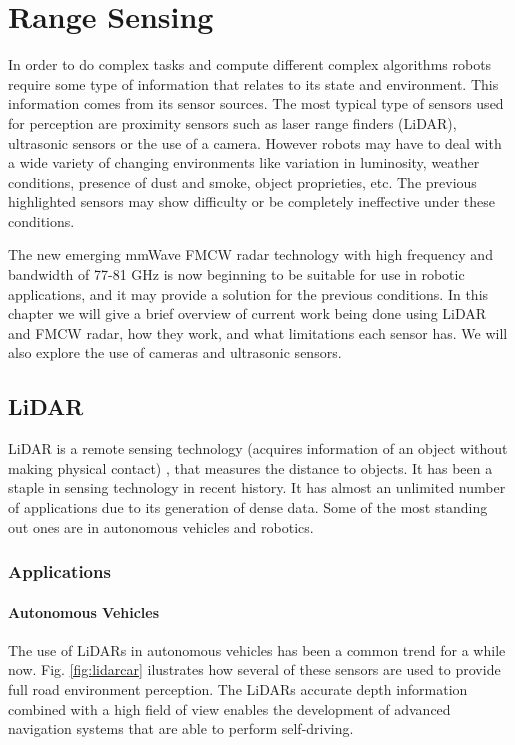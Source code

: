 \chapter{Range Sensing} \label{ch:Concepts}

In order to do complex tasks and compute different complex algorithms robots require some type of information that relates to its state and environment. This information comes from its sensor sources.
The most typical type of sensors used for perception are proximity sensors such as laser range finders (\ac{LiDAR}), ultrasonic sensors or the use of a camera. However robots may have to deal with a wide variety of changing environments like variation in luminosity, weather conditions, presence of dust and smoke, object proprieties, etc. The previous highlighted sensors may show difficulty or be completely ineffective under these conditions.

The new emerging \ac{mmWave} \ac{FMCW} radar technology with high frequency and bandwidth of 77-81 GHz is now beginning to be suitable for use in robotic applications, and it may provide a solution for the previous conditions. In this chapter we will give a brief overview of current work being done using \ac{LiDAR} and \ac{FMCW} \ac{radar}, how they work, and what limitations each sensor has. We will also explore the use of cameras and ultrasonic sensors.

\section{LiDAR}
\ac{LiDAR} is a remote sensing technology (acquires information of an object without making physical contact) , that measures the distance to objects. It has been a staple in sensing technology in recent history. It has almost an  unlimited  number of applications \cite{lidar100uses} due to its generation of dense data. Some of the most standing out ones are in autonomous vehicles and robotics.
\subsection{Applications}

\subsubsection{Autonomous Vehicles}
The use of \ac{LiDAR}s in autonomous vehicles has been a common trend for a while now. Fig. \ref{fig:lidarcar} ilustrates how several of these sensors are used to provide full road environment perception. The \ac{LiDAR}s accurate depth information combined with a high field of view enables the development of advanced navigation systems that are able to perform self-driving.
 
